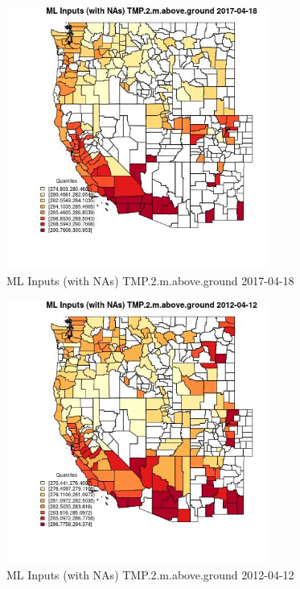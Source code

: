 \begin{figure} 
\centering  
\includegraphics[width=0.77\textwidth]{Code_Outputs/Report_ML_input_PM25_Step4_part_e_de_duplicated_aves_compiled_2019-05-14wNAs_CountyTMP2mabovegroundMean2017-04-18_2017-04-18.jpg} 
\caption{\label{fig:Report_ML_input_PM25_Step4_part_e_de_duplicated_aves_compiled_2019-05-14wNAsCountyTMP2mabovegroundMean2017-04-18_2017-04-18}ML Inputs (with NAs) TMP.2.m.above.ground 2017-04-18} 
\end{figure} 
 

\begin{figure} 
\centering  
\includegraphics[width=0.77\textwidth]{Code_Outputs/Report_ML_input_PM25_Step4_part_e_de_duplicated_aves_compiled_2019-05-14wNAs_CountyTMP2mabovegroundMean2012-04-12_2012-04-12.jpg} 
\caption{\label{fig:Report_ML_input_PM25_Step4_part_e_de_duplicated_aves_compiled_2019-05-14wNAsCountyTMP2mabovegroundMean2012-04-12_2012-04-12}ML Inputs (with NAs) TMP.2.m.above.ground 2012-04-12} 
\end{figure} 
 

